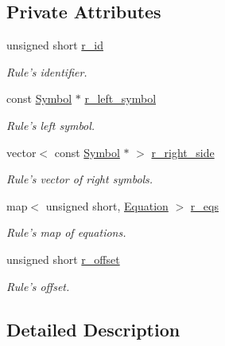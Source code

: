 \subsection*{Private Attributes}
\begin{DoxyCompactItemize}
\item 
unsigned short \hyperlink{classgenevalmag_1_1Rule_a4dbfbae772914ba343251d7f027f48c6}{r\_\-id}
\begin{DoxyCompactList}\small\item\em Rule's identifier. \item\end{DoxyCompactList}\item 
const \hyperlink{classgenevalmag_1_1Symbol}{Symbol} $\ast$ \hyperlink{classgenevalmag_1_1Rule_a7c56c879a7e4fdb2d35c79e061bfe862}{r\_\-left\_\-symbol}
\begin{DoxyCompactList}\small\item\em Rule's left symbol. \item\end{DoxyCompactList}\item 
vector$<$ const \hyperlink{classgenevalmag_1_1Symbol}{Symbol} $\ast$ $>$ \hyperlink{classgenevalmag_1_1Rule_a54d3f67fb2b9adb926c9c82aa2d2353b}{r\_\-right\_\-side}
\begin{DoxyCompactList}\small\item\em Rule's vector of right symbols. \item\end{DoxyCompactList}\item 
map$<$ unsigned short, \hyperlink{classgenevalmag_1_1Equation}{Equation} $>$ \hyperlink{classgenevalmag_1_1Rule_aacf0a4aeb6ca8e955490731de96902d2}{r\_\-eqs}
\begin{DoxyCompactList}\small\item\em Rule's map of equations. \item\end{DoxyCompactList}\item 
unsigned short \hyperlink{classgenevalmag_1_1Rule_a7560aff8568cd1003d0a770729fa4873}{r\_\-offset}
\begin{DoxyCompactList}\small\item\em Rule's offset. \item\end{DoxyCompactList}\end{DoxyCompactItemize}


\subsection{Detailed Description}


